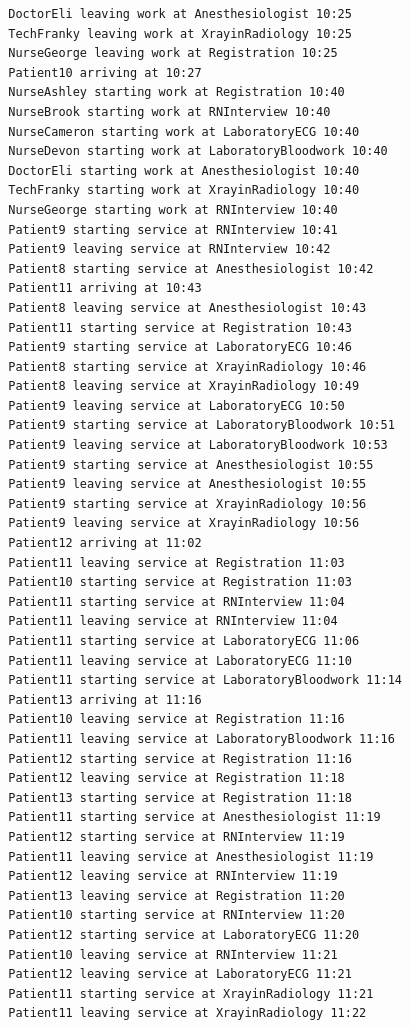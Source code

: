 \documentclass[12pt]{article}
\begin{document}
\begin{verbatim}
		DoctorEli leaving work at Anesthesiologist 10:25
		TechFranky leaving work at XrayinRadiology 10:25
		NurseGeorge leaving work at Registration 10:25
		Patient10 arriving at 10:27
		NurseAshley starting work at Registration 10:40
		NurseBrook starting work at RNInterview 10:40
		NurseCameron starting work at LaboratoryECG 10:40
		NurseDevon starting work at LaboratoryBloodwork 10:40
		DoctorEli starting work at Anesthesiologist 10:40
		TechFranky starting work at XrayinRadiology 10:40
		NurseGeorge starting work at RNInterview 10:40
		Patient9 starting service at RNInterview 10:41
		Patient9 leaving service at RNInterview 10:42
		Patient8 starting service at Anesthesiologist 10:42
		Patient11 arriving at 10:43
		Patient8 leaving service at Anesthesiologist 10:43
		Patient11 starting service at Registration 10:43
		Patient9 starting service at LaboratoryECG 10:46
		Patient8 starting service at XrayinRadiology 10:46
		Patient8 leaving service at XrayinRadiology 10:49
		Patient9 leaving service at LaboratoryECG 10:50
		Patient9 starting service at LaboratoryBloodwork 10:51
		Patient9 leaving service at LaboratoryBloodwork 10:53
		Patient9 starting service at Anesthesiologist 10:55
		Patient9 leaving service at Anesthesiologist 10:55
		Patient9 starting service at XrayinRadiology 10:56
		Patient9 leaving service at XrayinRadiology 10:56
		Patient12 arriving at 11:02
		Patient11 leaving service at Registration 11:03
		Patient10 starting service at Registration 11:03
		Patient11 starting service at RNInterview 11:04
		Patient11 leaving service at RNInterview 11:04
		Patient11 starting service at LaboratoryECG 11:06
		Patient11 leaving service at LaboratoryECG 11:10
		Patient11 starting service at LaboratoryBloodwork 11:14
		Patient13 arriving at 11:16
		Patient10 leaving service at Registration 11:16
		Patient11 leaving service at LaboratoryBloodwork 11:16
		Patient12 starting service at Registration 11:16
		Patient12 leaving service at Registration 11:18
		Patient13 starting service at Registration 11:18
		Patient11 starting service at Anesthesiologist 11:19
		Patient12 starting service at RNInterview 11:19
		Patient11 leaving service at Anesthesiologist 11:19
		Patient12 leaving service at RNInterview 11:19
		Patient13 leaving service at Registration 11:20
		Patient10 starting service at RNInterview 11:20
		Patient12 starting service at LaboratoryECG 11:20
		Patient10 leaving service at RNInterview 11:21
		Patient12 leaving service at LaboratoryECG 11:21
		Patient11 starting service at XrayinRadiology 11:21
		Patient11 leaving service at XrayinRadiology 11:22

\end{verbatim}
\end{document}
